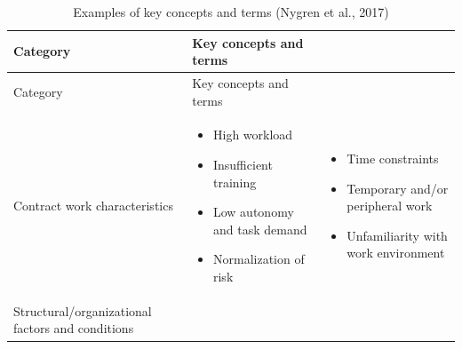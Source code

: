 \documentclass[
  12pt,
]{scrbook}
\begin{document}
\hypertarget{tbl:tablex}{}
\begin{longtable}[]{@{}lll@{}}
\caption{\label{tbl:tablex}Examples of key concepts and terms (Nygren et al., 2017)}\tabularnewline
\toprule
\begin{minipage}[b]{0.31\columnwidth}\raggedright
Category\strut
\end{minipage} & \begin{minipage}[b]{0.27\columnwidth}\raggedright
Key concepts and terms\strut
\end{minipage} & \begin{minipage}[b]{0.33\columnwidth}\raggedright
\strut
\end{minipage}\tabularnewline
\midrule
\endfirsthead
\toprule
\begin{minipage}[b]{0.31\columnwidth}\raggedright
Category\strut
\end{minipage} & \begin{minipage}[b]{0.27\columnwidth}\raggedright
Key concepts and terms\strut
\end{minipage} & \begin{minipage}[b]{0.33\columnwidth}\raggedright
\strut
\end{minipage}\tabularnewline
\midrule
\endhead
\begin{minipage}[t]{0.31\columnwidth}\raggedright
Contract work characteristics\strut
\end{minipage} & \begin{minipage}[t]{0.27\columnwidth}\raggedright
\begin{itemize}
\item
  High workload
\item
  Insufficient training
\item
  Low autonomy and task demand
\item
  Normalization of risk
\end{itemize}\strut
\end{minipage} & \begin{minipage}[t]{0.33\columnwidth}\raggedright
\begin{itemize}
\item
  Time constraints
\item
  Temporary and/or peripheral work
\item
  Unfamiliarity with work environment
\end{itemize}\strut
\end{minipage}\tabularnewline
\begin{minipage}[t]{0.31\columnwidth}\raggedright
Structural/organizational factors and conditions\strut

\end{minipage}
\end{longtable}
\end{document}

